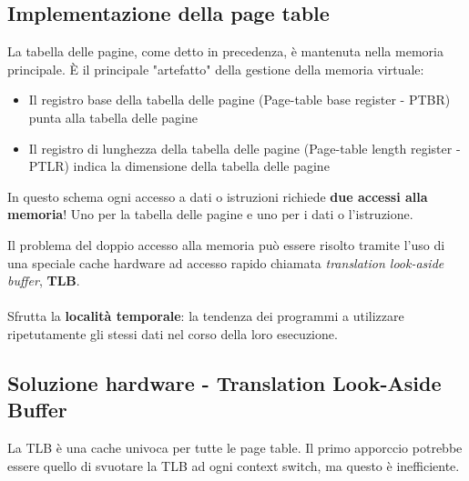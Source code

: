 \subsection{Implementazione della page table}
La tabella delle pagine, come detto in precedenza, è mantenuta nella memoria principale. È il principale "artefatto" della gestione della memoria virtuale:

\begin{itemize}
  \item[] Il registro base della tabella delle pagine (Page-table base register - PTBR) punta alla tabella delle pagine
  \item[] Il registro di lunghezza della tabella delle pagine (Page-table length register - PTLR) indica la dimensione della tabella delle pagine
\end{itemize}

In questo schema ogni accesso a dati o istruzioni richiede \textbf{due accessi alla memoria}! Uno per la tabella delle pagine e uno per i dati o l'istruzione.

Il problema del doppio accesso alla memoria può essere risolto tramite l'uso di una speciale cache hardware ad accesso rapido chiamata \textit{translation look-aside buffer}, \textbf{TLB}.

\paragraph{}
Sfrutta la \textbf{località temporale}: la tendenza dei programmi a utilizzare ripetutamente gli stessi dati nel corso della loro esecuzione.

\subsection{Soluzione hardware - Translation Look-Aside Buffer}


La TLB è una cache univoca per tutte le page table. Il primo apporccio potrebbe essere
quello di svuotare la TLB ad ogni context switch, ma questo è inefficiente.

